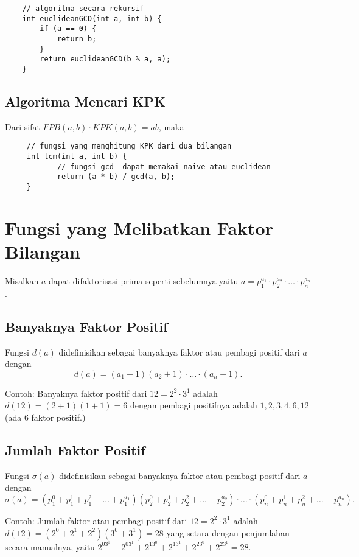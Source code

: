 	\begin{lstlisting}
	// algoritma secara rekursif
	int euclideanGCD(int a, int b) {
	    if (a == 0) {
	        return b;
	    }
	    return euclideanGCD(b % a, a);
	}
	\end{lstlisting}
	
	\subsection{Algoritma Mencari KPK}
	Dari sifat $FPB(a,b) \cdot KPK(a,b) = ab$, maka
	 \begin{lstlisting}
	 // fungsi yang menghitung KPK dari dua bilangan
	 int lcm(int a, int b) {
		 	// fungsi gcd  dapat memakai naive atau euclidean
		 	return (a * b) / gcd(a, b); 
	 }
	 \end{lstlisting}
	 
	  \section{Fungsi yang Melibatkan Faktor Bilangan}
	     Misalkan $a$ dapat difaktorisasi prima seperti sebelumnya yaitu $a=p_1^{a_1}\cdot p_2^{a_2}\cdot \ldots \cdot p_n^{a_n}$.
	     \subsection{Banyaknya Faktor Positif}
	     Fungsi $d(a)$ didefinisikan sebagai banyaknya faktor atau pembagi positif dari $a$ dengan
	     $$d(a) = (a_1+1)(a_2+1)\cdot \ldots \cdot (a_n+1).$$
	     
	     Contoh: Banyaknya faktor positif dari $12= 2^2 \cdot 3^1$ adalah $d(12)=(2+1)(1+1)=6$ dengan pembagi positifnya adalah $1,2,3,4,6,12$ (ada 6 faktor positif.)
	     
	     \subsection{Jumlah Faktor Positif}
	     Fungsi $\sigma (a)$ didefinisikan sebagai banyaknya faktor atau pembagi positif dari $a$ dengan
	     $$\sigma (a) = (p_1^0+p_1^1+p_1^2+\dots+p_1^{a_1})(p_2^0+p_2^1+p_2^2+\dots+p_2^{a_2})\cdot \ldots \cdot (p_n^0+p_n^1+p_n^2+\dots+p_n^{a_n}).$$
	     
	     Contoh: Jumlah faktor atau pembagi positif dari $12= 2^2 \cdot 3^1$ adalah $d(12)=(2^0+2^1+2^2)(3^0+3^1)=28$ yang setara dengan penjumlahan secara manualnya, yaitu $2^03^0+2^03^1+2^13^0+2^13^1+2^23^0+2^23^1=28.$
	     

